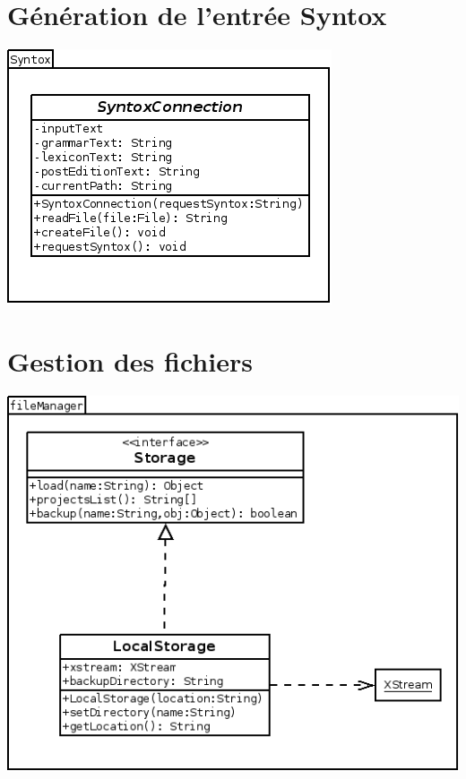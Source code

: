 \documentclass[12pt]{report}
\begin{document}
\section{Génération de l'entrée Syntox}

\begin{center}
\includegraphics[scale=0.6]{diversuml/SyntoxConnection.png}
\end{center}



\section{Gestion des fichiers}


\begin{center}
\includegraphics[scale=0.55]{diversuml/fileManager.png}
\end{center}
\end{document}
